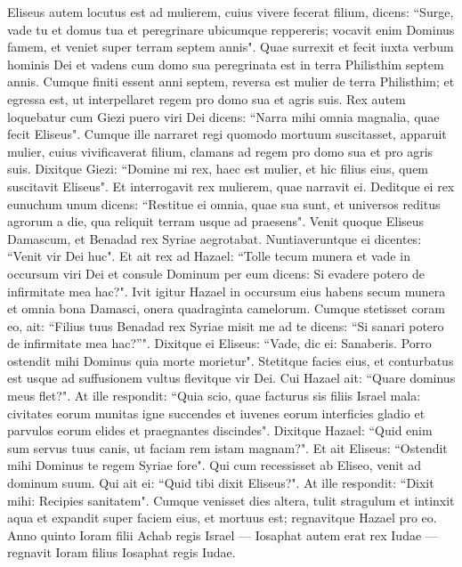 \begin{biblechapter}  
\verse Eliseus autem locutus est ad mulierem, cuius vivere fecerat filium, dicens: “Surge, vade tu et domus tua et peregrinare ubicumque reppereris; vocavit enim Dominus famem, et veniet super terram septem annis". 
\verse Quae surrexit et fecit iuxta verbum hominis Dei et vadens cum domo sua peregrinata est in terra Philisthim septem annis. 
\verse Cumque finiti essent anni septem, reversa est mulier de terra Philisthim; et egressa est, ut interpellaret regem pro domo sua et agris suis. 
\verse Rex autem loquebatur cum Giezi puero viri Dei dicens: “Narra mihi omnia magnalia, quae fecit Eliseus". 
\verse Cumque ille narraret regi quomodo mortuum suscitasset, apparuit mulier, cuius vivificaverat filium, clamans ad regem pro domo sua et pro agris suis. Dixitque Giezi: “Domine mi rex, haec est mulier, et hic filius eius, quem suscitavit Eliseus". 
\verse Et interrogavit rex mulierem, quae narravit ei. Deditque ei rex eunuchum unum dicens: “Restitue ei omnia, quae sua sunt, et universos reditus agrorum a die, qua reliquit terram usque ad praesens". 
\verse Venit quoque Eliseus Damascum, et Benadad rex Syriae aegrotabat. Nuntiaveruntque ei dicentes: “Venit vir Dei huc". 
\verse Et ait rex ad Hazael: “Tolle tecum munera et vade in occursum viri Dei et consule Dominum per eum dicens: Si evadere potero de infirmitate mea hac?". 
\verse Ivit igitur Hazael in occursum eius habens secum munera et omnia bona Damasci, onera quadraginta camelorum. Cumque stetisset coram eo, ait: “Filius tuus Benadad rex Syriae misit me ad te dicens: “Si sanari potero de infirmitate mea hac?”". 
\verse Dixitque ei Eliseus: “Vade, dic ei: Sanaberis. Porro ostendit mihi Dominus quia morte morietur". 
\verse Stetitque facies eius, et conturbatus est usque ad suffusionem vultus flevitque vir Dei. 
\verse Cui Hazael ait: “Quare dominus meus flet?". At ille respondit: “Quia scio, quae facturus sis filiis Israel mala: civitates eorum munitas igne succendes et iuvenes eorum interficies gladio et parvulos eorum elides et praegnantes discindes". 
\verse Dixitque Hazael: “Quid enim sum servus tuus canis, ut faciam rem istam magnam?". Et ait Eliseus: “Ostendit mihi Dominus te regem Syriae fore". 
\verse Qui cum recessisset ab Eliseo, venit ad dominum suum. Qui ait ei: “Quid tibi dixit Eliseus?". At ille respondit: “Dixit mihi: Recipies sanitatem". 
\verse Cumque venisset dies altera, tulit stragulum et intinxit aqua et expandit super faciem eius, et mortuus est; regnavitque Hazael pro eo. 
\verse Anno quinto Ioram filii Achab regis Israel — Iosaphat autem erat rex Iudae — regnavit Ioram filius Iosaphat regis Iudae. 

\end{biblechapter}
